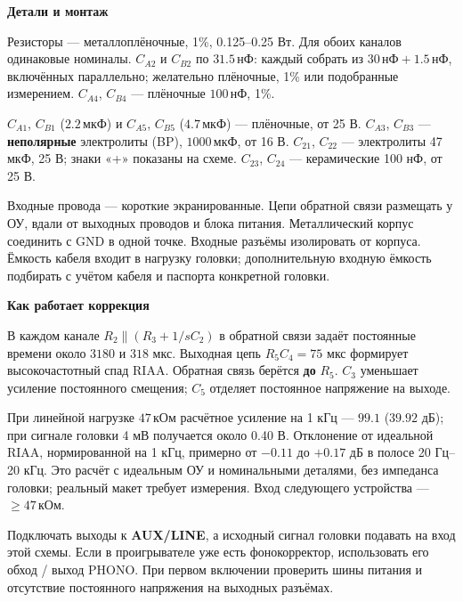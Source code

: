 \documentclass[a4paper,landscape,11pt]{article}
\newcommand{\kohm}{\,\text{кОм}}
\newcommand{\nf}{\,\text{нФ}}
\newcommand{\uf}{\,\text{мкФ}}
\begin{document}
\vspace{4mm}
\begin{minipage}[t]{0.48\linewidth}
\textbf{Детали и монтаж}\par\vspace{1mm}
Резисторы — металлоплёночные, 1\%, 0.125–0.25 Вт.
Для обоих каналов одинаковые номиналы.
$C_{A2}$ и $C_{B2}$ по $31.5\nf$:
каждый собрать из $30\nf+1.5\nf$, включённых параллельно;
желательно плёночные, 1\% или подобранные измерением.
$C_{A4}$, $C_{B4}$ — плёночные $100\nf$, 1\%.
\par\vspace{2mm}
$C_{A1}$, $C_{B1}$ ($2.2\uf$) и $C_{A5}$, $C_{B5}$ ($4.7\uf$) —
плёночные, от 25 В. $C_{A3}$, $C_{B3}$ — \textbf{неполярные}
электролиты (BP), $1000\uf$, от 16 В.
$C_{21}$, $C_{22}$ — электролиты 47 мкФ, 25 В; знаки «+» показаны на схеме.
$C_{23}$, $C_{24}$ — керамические 100 нФ, от 25 В.
\par\vspace{2mm}
Входные провода — короткие экранированные. Цепи обратной связи размещать у ОУ,
вдали от выходных проводов и блока питания. Металлический корпус соединить с GND
в одной точке. Входные разъёмы изолировать от корпуса.
Ёмкость кабеля входит в нагрузку головки; дополнительную входную ёмкость
подбирать с учётом кабеля и паспорта конкретной головки.
\end{minipage}\hfill
\begin{minipage}[t]{0.48\linewidth}
\textbf{Как работает коррекция}\par\vspace{1mm}
В каждом канале $R_2\parallel(R_3+1/sC_2)$ в обратной связи
задаёт постоянные времени около $3180$ и $318$ мкс.
Выходная цепь $R_5C_4=75$ мкс формирует высокочастотный спад RIAA.
Обратная связь берётся \textbf{до} $R_5$.
$C_3$ уменьшает усиление постоянного смещения; $C_5$ отделяет постоянное
напряжение на выходе.
\par\vspace{2mm}
При линейной нагрузке $47\kohm$ расчётное усиление на 1 кГц — $99.1$
($39.92$ дБ); при сигнале головки 4 мВ получается около 0.40 В.
Отклонение от идеальной RIAA, нормированной на 1 кГц, примерно от
$-0.11$ до $+0.17$ дБ в полосе 20 Гц–20 кГц.
Это расчёт с идеальным ОУ и номинальными деталями, без импеданса головки;
реальный макет требует измерения. Вход следующего устройства — $\geq47\kohm$.
\par\vspace{2mm}
Подключать выходы к \textbf{AUX/LINE}, а исходный сигнал головки подавать
на вход этой схемы. Если в проигрывателе уже есть фонокорректор, использовать
его обход / выход PHONO. При первом включении проверить шины питания и отсутствие
постоянного напряжения на выходных разъёмах.
\end{minipage}
\end{document}

